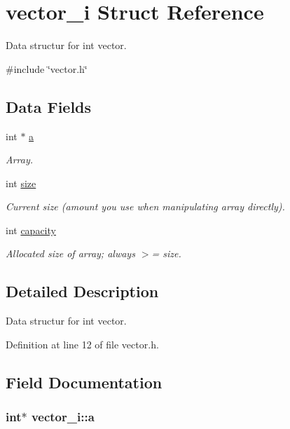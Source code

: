 \hypertarget{structvector__i}{\section{vector\-\_\-i \-Struct \-Reference}
\label{structvector__i}
}


\-Data structur for int vector.  




{\ttfamily \#include \char`\"{}vector.\-h\char`\"{}}

\subsection*{\-Data \-Fields}
\begin{DoxyCompactItemize}
\item 
int $\ast$ \hyperlink{structvector__i_a1f7c0e586cb1e09323dec3dd48d13882}{a}
\begin{DoxyCompactList}\small\item\em \-Array. \end{DoxyCompactList}\item 
int \hyperlink{structvector__i_a04afc9e861d169d920fc8d2a26b670cd}{size}
\begin{DoxyCompactList}\small\item\em \-Current size (amount you use when manipulating array directly). \end{DoxyCompactList}\item 
int \hyperlink{structvector__i_af108aa670ac888975024a428c31f27fc}{capacity}
\begin{DoxyCompactList}\small\item\em \-Allocated size of array; always $>$= size. \end{DoxyCompactList}\end{DoxyCompactItemize}


\subsection{\-Detailed \-Description}
\-Data structur for int vector. 



\-Definition at line 12 of file vector.\-h.



\subsection{\-Field \-Documentation}
\hypertarget{structvector__i_a1f7c0e586cb1e09323dec3dd48d13882}{
\subsubsection[{a}]{\setlength{\rightskip}{0pt plus 5cm}int$\ast$ {\bf vector\-\_\-i\-::a}}}\label{structvector__i_a1f7c0e586cb1e09323dec3dd48d13882}


